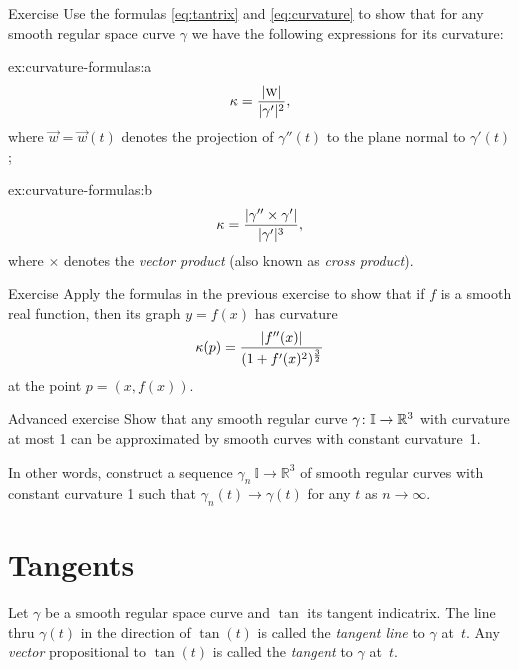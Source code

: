 \begin{thm}{Exercise}\label{ex:curvature-formulas}
Use the formulas \ref{eq:tantrix} and \ref{eq:curvature} to show that 
for any smooth regular space curve $\gamma$ we have the following expressions for its curvature:
\setlength{\columnseprule}{0.4pt}
\begin{multicols}{2}

\begin{subthm}{ex:curvature-formulas:a} 
\[\kappa=\frac{|\text{\sc{w}}|}{|\gamma'|^2},\]
where $\vec w=\vec w(t)$ denotes the projection of $\gamma''(t)$ to the plane normal to $\gamma'(t)$;
\end{subthm}

\begin{subthm}{ex:curvature-formulas:b}
\[\kappa=\frac{|\gamma''\times \gamma'|}{|\gamma'|^{3}},\]
where $\times$ denotes the \emph{vector product} (also known as \emph{cross product}).
\end{subthm}
\end{multicols}
\end{thm}


\begin{thm}{Exercise}\label{ex:curvature-graph}
Apply the formulas in the previous exercise to show that if $f$ is a smooth real function,
then its graph $y=f(x)$  has curvature
\[\kappa(p)=\frac{|f''(x)|}{(1+f'(x)^2)^{\frac32}}\]
at the point $p=(x,f(x))$.
\end{thm}

\begin{thm}{Advanced exercise}\label{ex:approximation-const-curvature}
Show that any smooth regular curve $\gamma\:\mathbb{I}\z\to\mathbb{R}^3$ with curvature at most 1 can be approximated by smooth curves with constant curvature~1.

In other words, construct a sequence $\gamma_n\:\mathbb{I}\to\mathbb{R}^3$ of smooth regular curves  with constant curvature 1 such that $\gamma_n(t)\to \gamma(t)$ for any $t$ as $n\to\infty$.
\end{thm}

\section{Tangents}

Let $\gamma$ be a smooth regular space curve and $\tan$ its tangent indicatrix.
The line thru $\gamma(t)$ in the direction of $\tan(t)$ is called the \emph{tangent line} to $\gamma$  at~$t$.
Any \emph{vector} propositional to $\tan(t)$ is called the \emph{tangent} to $\gamma$  at~$t$.

